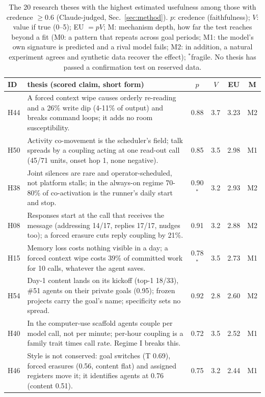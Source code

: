 \begin{table}[t]
\caption{The 20 research theses with the highest estimated usefulness among those with credence $\geq 0.6$ (Claude-judged, Sec.~\ref{sec:method}). $p$: credence (faithfulness); $V$: value if true (0--5); EU $=pV$; M: mechanism depth, how far the test reaches beyond a fit (M0: a pattern that repeats across goal periods; M1: the model's own signature is predicted and a rival model fails; M2: in addition, a natural experiment agrees and synthetic data recover the effect); $^\ast$fragile. No thesis has passed a confirmation test on reserved data.}
\label{tab:theses}
\scriptsize\renewcommand{\arraystretch}{1.05}
\begin{tabular}{@{}l p{} c c c c@{}}
\toprule
ID & thesis (scored claim, short form) & $p$ & $V$ & EU & M\\ \midrule
H44 & A forced context wipe causes orderly re-reading and a 26\% write dip (4-11\% of output) and breaks command loops; it adds no room susceptibility. & 0.88 & 3.7 & 3.23 & M2\\
H50 & Activity co-movement is the scheduler's field; talk spreads by a coupling acting at one read-out call (45/71 units, onset hop 1, none negative). & 0.85 & 3.5 & 2.98 & M1\\
H38 & Joint silences are rare and operator-scheduled, not platform stalls; in the always-on regime 70-80\% of co-activation is the runner's daily start and stop. & 0.90$^\ast$ & 3.2 & 2.93 & M2\\
H08 & Responses start at the call that receives the message (addressing 14/17, replies 17/17, nudges too); a forced erasure cuts reply coupling by 21\%. & 0.91 & 3.2 & 2.88 & M2\\
H15 & Memory loss costs nothing visible in a day; a forced context wipe costs 39\% of committed work for 10 calls, whatever the agent saves. & 0.78$^\ast$ & 3.5 & 2.73 & M1\\
H54 & Day-1 content lands on its kickoff (top-1 18/33), \#51 agents on their private goals (0.95); frozen projects carry the goal's name; specificity sets no spread. & 0.92 & 2.8 & 2.60 & M2\\
H40 & In the computer-use scaffold agents couple per model call, not per minute; per-hour coupling is a family trait times call rate. Regime I breaks this. & 0.72 & 3.5 & 2.52 & M1\\
H46 & Style is not conserved: goal switches (T 0.69), forced erasures (0.56, content flat) and assigned registers move it; it identifies agents at 0.76 (content 0.51). & 0.75 & 3.2 & 2.44 & M1\\

\end{tabular}
\end{table}
